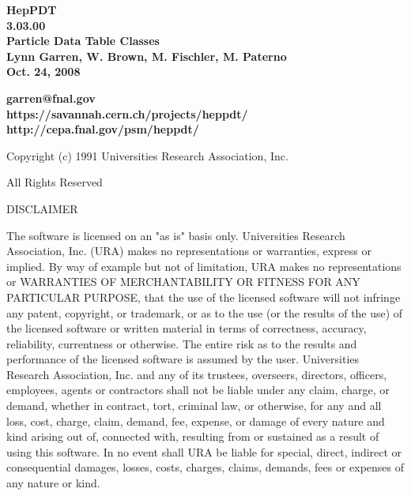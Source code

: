 \begin{titlepage}

{}

\vspace{2.0in}
\begin{center}
  {\LARGE\bf  HepPDT \\ 3.03.00 \\}
  {\Large\bf  Particle Data Table Classes \\}
  {\Large\bf  Lynn Garren, W. Brown, M. Fischler, M. Paterno \\}
  {\Large\bf  Oct. 24, 2008 \\}
\end{center}
\vspace{2.0in}
\begin{center}
  {\large\bf  garren@fnal.gov \\}
  {\large\bf  https://savannah.cern.ch/projects/heppdt/ \\}
  {\large\bf  http://cepa.fnal.gov/psm/heppdt/ \\}
\end{center}

\end{titlepage}

\vspace{0.5in}
\centerline{ Copyright (c) 1991   Universities Research Association, Inc. }
\centerline{   All Rights Reserved }
\vspace{0.2in}
\centerline{ DISCLAIMER }

The software is licensed on an "as is" basis only.  Universities Research
Association, Inc. (URA) makes no representations or warranties, express
or implied.  By way of example but not of limitation, URA makes no
representations or WARRANTIES OF MERCHANTABILITY OR FITNESS FOR ANY
PARTICULAR PURPOSE, that  the use of the licensed software will not
infringe any patent, copyright, or trademark, or as to the use (or the
results of the use) of the licensed  software or written material in
terms of correctness, accuracy, reliability, currentness or otherwise.
The entire risk as to the results and performance of the  licensed
software is assumed by the user.  Universities Research Association, Inc.
and any of its trustees, overseers, directors, officers, employees,
agents or contractors shall not be liable under any claim, charge, or
demand, whether in contract, tort, criminal law, or otherwise, for any
and all loss, cost, charge, claim, demand, fee, expense, or damage of
every nature and kind arising out of, connected with, resulting from or
sustained as a result of using this software. In no event shall URA be
liable for special, direct, indirect or consequential damages, losses,
costs, charges, claims, demands, fees or expenses of any  nature or kind.
 
